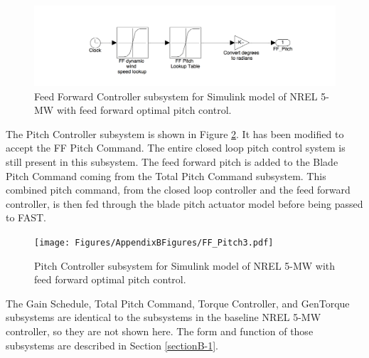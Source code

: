 \begin{figure}[ht]
	\centering
		\includegraphics[width=\linewidth]{Figures/AppendixBFigures/FF_Pitch2.png}
	\caption{Feed Forward Controller subsystem for Simulink model of NREL 5-MW with feed forward optimal pitch control.}
	\label{figB-8}
\end{figure}

The Pitch Controller subsystem is shown in Figure \ref{figB-9}. It has been modified to accept the FF Pitch Command. The entire closed loop pitch control system is still present in this subsystem. The feed forward pitch is added to the Blade Pitch Command coming from the Total Pitch Command subsystem. This combined pitch command, from the closed loop controller and the feed forward controller, is then fed through the blade pitch actuator model before being passed to FAST.

\begin{figure}[ht]
	\centering
		\texttt{[image: Figures/AppendixBFigures/FF\_Pitch3.pdf]}
	\caption{Pitch Controller subsystem for Simulink model of NREL 5-MW with feed forward optimal pitch control.}
	\label{figB-9}
\end{figure}

The Gain Schedule, Total Pitch Command, Torque Controller, and GenTorque subsystems are identical to the subsystems in the baseline NREL 5-MW controller, so they are not shown here. The form and function of those subsystems are described in Section \ref{sectionB-1}.

